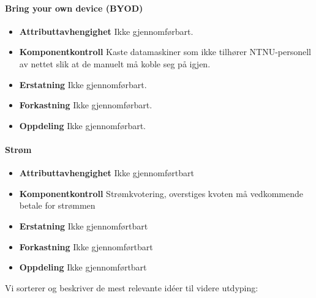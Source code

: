 \paragraph{Bring your own device (BYOD)}
\begin{itemize}
    \item \textbf{Attributtavhengighet} Ikke gjennomførbart.
    \item \textbf{Komponentkontroll} Kaste datamaskiner som ikke tilhører NTNU-personell av nettet slik at de manuelt må koble seg på igjen.
    \item \textbf{Erstatning} Ikke gjennomførbart.
    \item \textbf{Forkastning} Ikke gjennomførbart.
    \item \textbf{Oppdeling} Ikke gjennomførbart.
\end{itemize}

\paragraph{Strøm}
\begin{itemize}
    \item \textbf{Attributtavhengighet} Ikke gjennomførtbart
    \item \textbf{Komponentkontroll} Strømkvotering, overstiges kvoten må vedkommende betale for strømmen
    \item \textbf{Erstatning} Ikke gjennomførtbart
    \item \textbf{Forkastning} Ikke gjennomførtbart
    \item \textbf{Oppdeling} Ikke gjennomførtbart
\end{itemize}

Vi sorterer og beskriver de mest relevante idéer til videre utdyping:

